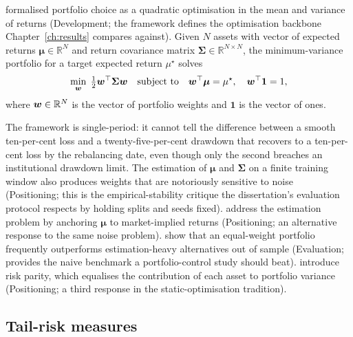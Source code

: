 \textcite{markowitz1952portfolio} formalised portfolio choice as a quadratic optimisation in the mean and variance of returns (Development; the framework defines the optimisation backbone Chapter~\ref{ch:results} compares against). Given $N$ assets with vector of expected returns $\boldsymbol{\mu} \in \mathbb{R}^N$ and return covariance matrix $\boldsymbol{\Sigma} \in \mathbb{R}^{N \times N}$, the minimum-variance portfolio for a target expected return $\mu^\star$ solves
\begin{equation}
  \label{eq:markowitz}
  \min_{\boldsymbol{w}} \; \tfrac{1}{2} \boldsymbol{w}^\top \boldsymbol{\Sigma} \boldsymbol{w}
  \quad \text{subject to} \quad
  \boldsymbol{w}^\top \boldsymbol{\mu} = \mu^\star, \quad \boldsymbol{w}^\top \mathbf{1} = 1,
\end{equation}
where $\boldsymbol{w} \in \mathbb{R}^N$ is the vector of portfolio weights and $\mathbf{1}$ is the vector of ones.

The framework is single-period: it cannot tell the difference between a smooth ten-per-cent loss and a twenty-five-per-cent drawdown that recovers to a ten-per-cent loss by the rebalancing date, even though only the second breaches an institutional drawdown limit. The estimation of $\boldsymbol{\mu}$ and $\boldsymbol{\Sigma}$ on a finite training window also produces weights that are notoriously sensitive to noise~\parencite{michaud1989markowitz} (Positioning; this is the empirical-stability critique the dissertation's evaluation protocol respects by holding splits and seeds fixed). \textcite{black1992global} address the estimation problem by anchoring $\boldsymbol{\mu}$ to market-implied returns (Positioning; an alternative response to the same noise problem). \textcite{demiguel2009naive} show that an equal-weight portfolio frequently outperforms estimation-heavy alternatives out of sample (Evaluation; provides the naive benchmark a portfolio-control study should beat). \textcite{maillard2010risk} introduce risk parity, which equalises the contribution of each asset to portfolio variance (Positioning; a third response in the static-optimisation tradition).

\subsection{Tail-risk measures}
\label{sec:var_es}

